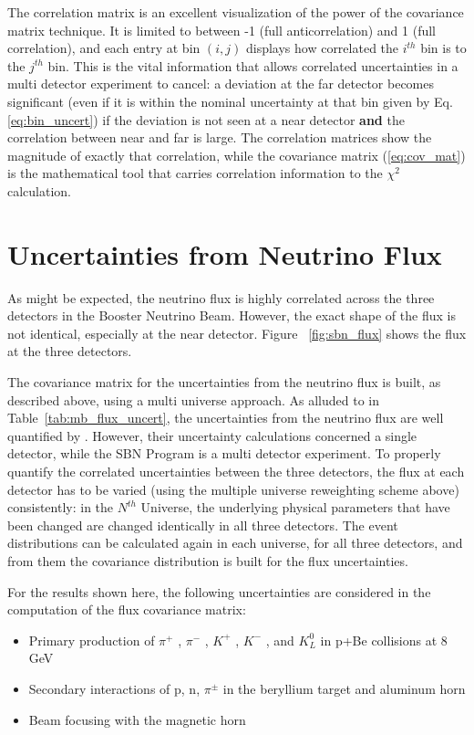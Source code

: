 The correlation matrix is an excellent visualization of the power of the covariance matrix technique.  It is limited to between -1 (full anticorrelation) and 1 (full correlation), and each entry at bin $(i,j)$ displays how correlated the $i^{th}$ bin is to the $j^{th}$ bin.  This is the vital information that allows correlated uncertainties in a multi detector experiment to cancel: a deviation at the far detector becomes significant (even if it is within the nominal uncertainty at that bin given by Eq. \ref{eq:bin_uncert}) if the deviation is not seen at a near detector {\bf and} the correlation between near and far is large.  The correlation matrices show the magnitude of exactly that correlation, while the covariance matrix (\ref{eq:cov_mat}) is the mathematical tool that carries correlation information to the $\chi^2$ calculation.


\section{Uncertainties from Neutrino Flux}

\label{section:flux_uncert}

As might be expected, the neutrino flux is highly correlated across the three detectors in the Booster Neutrino Beam.  However, the exact shape of the flux is not identical, especially at the near detector.  Figure~ \ref{fig:sbn_flux} shows the flux at the three detectors.

The covariance matrix for the uncertainties from the neutrino flux is built, as described above, using a multi universe approach.  As alluded to in Table~\ref{tab:mb_flux_uncert}, the uncertainties from the neutrino flux are well quantified by \MB.  However, their uncertainty calculations concerned a single detector, while the SBN Program is a multi detector experiment.  To properly quantify the correlated uncertainties between the three detectors, the flux at each detector has to be varied (using the multiple universe reweighting scheme above) consistently: in the $N^{th}$ Universe, the underlying physical parameters that have been changed are changed identically in all three detectors.  The event distributions can be calculated again in each universe, for all three detectors, and from them the covariance distribution is built for the flux uncertainties.

For the results shown here, the following uncertainties are considered in the computation of the flux covariance matrix:

\begin{itemize}
\item Primary production of $\pi^+$ , $\pi^-$ , $K^+$ , $K^−$ , and $K_L^0$ in p+Be collisions at 8 GeV
\item Secondary interactions of p, n, $\pi^{\pm}$ in the beryllium target and aluminum horn
\item Beam focusing with the magnetic horn
\end{itemize}

